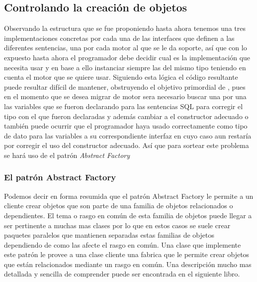 \subsection{Controlando la creación de objetos}
Observando la estructura que se fue proponiendo hasta ahora tenemos una tres implementaciones concretas por cada una de las interfaces que definen a las diferentes sentencias, una por cada motor al que se le da soporte, así que con lo expuesto hasta ahora el programador debe decidir cual es la implementación que necesita usar y en base a ello instanciar siempre las del mismo tipo teniendo en cuenta el motor que se quiere usar. Siguiendo esta lógica el código resultante puede resultar difícil de mantener, obstruyendo el objetivo primordial de \jj,  pues en el momento que se desea migrar de motor sera necesario buscar una por una las variables que se fueron declarando para las sentencias SQL para corregir el tipo con el que fueron declaradas y además cambiar a el constructor adecuado o también puede ocurrir que el programador haya usado correctamente como tipo de dato para las variables a su correspondiente interfaz en cuyo caso aun restaría por corregir el uso del constructor adecuado. Así que para sortear este problema se hará uso de el patrón \textit{Abstract Factory}
%
\subsubsection{El patrón Abstract Factory}
Podemos decir en forma resumida que el patrón Abstract Factory le permite a un cliente crear objetos que son parte de una familia de objetos relacionados o dependientes. El tema o rasgo en común de esta familia de objetos puede llegar a ser pertinente a muchas mas clases por lo que en estos casos se suele crear paquetes paralelos que mantienen separadas estas familias de objetos dependiendo de como las afecte el rasgo en común. Una clase que implemente este patrón le provee a una clase cliente una fabrica que le permite crear objetos que están relacionados mediante un rasgo en común. Una descripción mucho mas detallada y sencilla de comprender puede ser encontrada en el siguiente libro\cite{Metsker:2002:DPJ}. 

